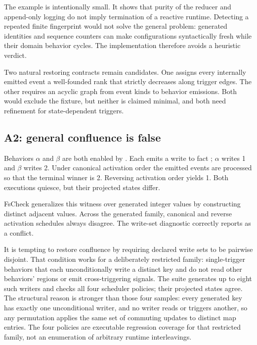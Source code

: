 The example is intentionally small.  It shows that purity of the reducer and
append-only logging do not imply termination of a reactive runtime.  Detecting
a repeated finite fingerprint would not solve the general problem: generated
identities and sequence counters can make configurations syntactically fresh
while their domain behavior cycles.  The implementation therefore avoids a
heuristic  verdict.

Two natural restoring contracts remain candidates.  One assigns every
internally emitted event a well-founded rank that strictly decreases along
trigger edges.  The other requires an acyclic graph from event kinds to
behavior emissions.  Both would exclude the fixture, but neither is claimed
minimal, and both need refinement for state-dependent triggers.

\subsection{A2: general confluence is false}

\begin{counterexample}
Behaviors $\alpha$ and $\beta$ are both enabled by .  Each emits a
write to fact ; $\alpha$ writes 1 and $\beta$ writes 2.  Under
canonical activation order the emitted events are processed so that the
terminal winner is 2.  Reversing activation order yields 1.  Both executions
quiesce, but their projected states differ.
\end{counterexample}

FsCheck generalizes this witness over generated integer values by constructing
distinct adjacent values.  Across the generated family, canonical and reverse
activation schedules always disagree.  The write-set diagnostic correctly
reports  as a conflict.

It is tempting to restore confluence by requiring declared write sets to be
pairwise disjoint.  That condition works for a deliberately restricted family:
single-trigger behaviors that each unconditionally write a distinct key and do
not read other behaviors' regions or emit cross-triggering signals.  The suite
generates up to eight such writers and checks all four scheduler policies; their
projected states agree.  The structural reason is stronger than those four
samples: every generated key has exactly one unconditional writer, and no
writer reads or triggers another, so any permutation applies the same set of
commuting updates to distinct map entries.  The four policies are executable
regression coverage for that restricted family, not an enumeration of arbitrary
runtime interleavings.

